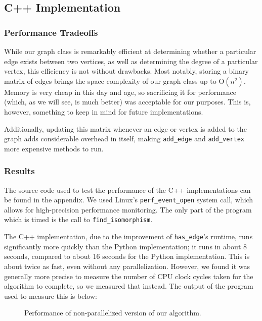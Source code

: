 \documentclass{article}
\begin{document}
  \subsection{C++ Implementation}

    \subsubsection{Performance Tradeoffs}
    While our graph class is remarkably efficient at determining whether a particular edge exists between two vertices, as well as determining the degree of a particular vertex, this efficiency is not without drawbacks. Most notably, storing a binary matrix of edges brings the space complexity of our graph class up to O$(n^2)$. Memory is very cheap in this day and age, so sacrificing it for performance (which, as we will see, is much better) was acceptable for our purposes. This is, however, something to keep in mind for future implementations.

    Additionally, updating this matrix whenever an edge or vertex is added to the graph adds considerable overhead in itself, making \texttt{add\_edge} and \texttt{add\_vertex} more expensive methods to run.

    \subsubsection{Results}
    The source code used to test the performance of the C++ implementations can be found in the appendix. We used Linux's \texttt{perf\_event\_open} system call, which allows for high-precision performance monitoring. The only part of the program which is timed is the call to \texttt{find\_isomorphism}.

    The C++ implementation, due to the improvement of \texttt{has\_edge}'s runtime, runs significantly more quickly than the Python implementation; it runs in about 8 seconds, compared to about 16 seconds for the Python implementation. This is about twice as fast, even without any parallelization. However, we found it was generally more precise to measure the number of CPU clock cycles taken for the algorithm to complete, so we measured that instead. The output of the program used to measure this is below:

  \setcounter{figure}{0}
  \begin{figure}[H]
    \centering
    
    \caption{Performance of non-parallelized version of our algorithm.}
    \label{ls:cperf}
  \end{figure}
\end{document}
